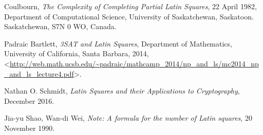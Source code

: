 \begin{thebibliography}    
    Coulbourn, \textit{The Complexity of Completing Partial Latin Squares}, 22 April 1982, Department of Computational Science, University of Saskatchewan, Saskatoon. Saskatchewan, S7N 0 WO, Canada.

    Padraic Bartlett, \textit{3SAT and Latin Squares}, Department of Mathematics, University of California, Santa Barbara, 2014, <\url{http://web.math.ucsb.edu/~padraic/mathcamp_2014/np_and_ls/mc2014_np_and_ls_lecture4.pdf}>.

    Nathan O. Schmidt, \textit{Latin Squares and their Applications to Cryptography}, December 2016.

    Jia-yu Shao, Wan-di Wei, \textit{Note: A formula for the number of Latin squares}, 20 November 1990.

 
\end{thebibliography}
